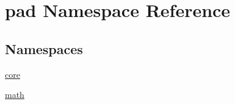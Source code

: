 \hypertarget{namespacepad}{}\section{pad Namespace Reference}
\label{namespacepad}
\subsection*{Namespaces}
\begin{DoxyCompactItemize}
\item 
 \mbox{\hyperlink{namespacepad_1_1core}{core}}
\item 
 \mbox{\hyperlink{namespacepad_1_1math}{math}}
\end{DoxyCompactItemize}
